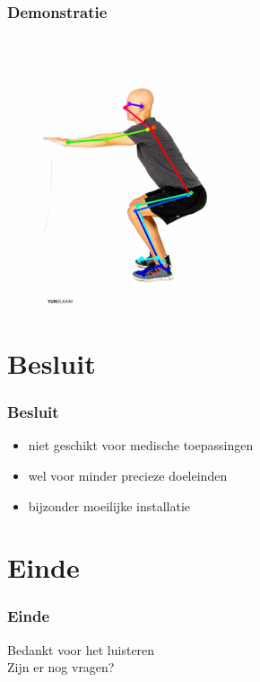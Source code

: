 \documentclass
   [kulak] %
   {kulakbeamer}
\begin{document}
\begin{frame}
	\frametitle{Demonstratie}
	\begin{figure}
		\includegraphics[width= .4\textwidth]{squat_HPE}
	\end{figure}
\end{frame}



\section{Besluit}

\begin{frame}
\frametitle{Besluit}
\begin{itemize}
	\item niet geschikt voor medische toepassingen
	\item wel voor minder precieze doeleinden
	\item bijzonder moeilijke installatie
\end{itemize}
\end{frame}

\section*{Einde}
\begin{frame}
\frametitle{Einde}
\begin{center}
	Bedankt voor het luisteren\\
	Zijn er nog vragen?
\end{center}
\end{frame}
\end{document}
